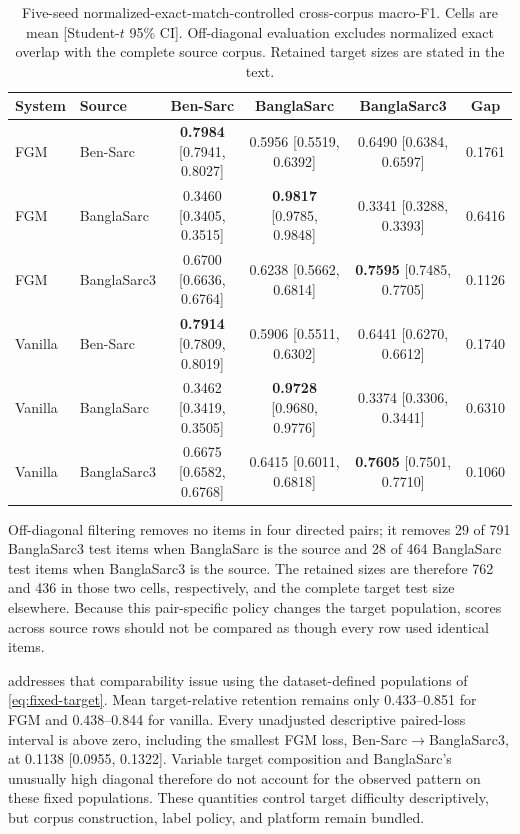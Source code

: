 \documentclass{ieeeaccess}
\begin{document}
\begin{table}[!t]
\centering
\caption{Five-seed normalized-exact-match-controlled cross-corpus macro-F1. Cells are mean [Student-$t$ 95\% CI]. Off-diagonal evaluation excludes normalized exact overlap with the complete source corpus. Retained target sizes are stated in the text.}
\label{tab:transfer}
\scriptsize
\setlength{\tabcolsep}{2.5pt}
\begin{tabular}{@{}llcccc@{}}
\toprule
\textbf{System} & \textbf{Source} & \textbf{Ben-Sarc} & \textbf{BanglaSarc} & \textbf{BanglaSarc3} & \textbf{Gap} \\
\midrule
FGM & Ben-Sarc & \textbf{0.7984} [0.7941, 0.8027] & 0.5956 [0.5519, 0.6392] & 0.6490 [0.6384, 0.6597] & 0.1761 \\
FGM & BanglaSarc & 0.3460 [0.3405, 0.3515] & \textbf{0.9817} [0.9785, 0.9848] & 0.3341 [0.3288, 0.3393] & 0.6416 \\
FGM & BanglaSarc3 & 0.6700 [0.6636, 0.6764] & 0.6238 [0.5662, 0.6814] & \textbf{0.7595} [0.7485, 0.7705] & 0.1126 \\
\midrule
Vanilla & Ben-Sarc & \textbf{0.7914} [0.7809, 0.8019] & 0.5906 [0.5511, 0.6302] & 0.6441 [0.6270, 0.6612] & 0.1740 \\
Vanilla & BanglaSarc & 0.3462 [0.3419, 0.3505] & \textbf{0.9728} [0.9680, 0.9776] & 0.3374 [0.3306, 0.3441] & 0.6310 \\
Vanilla & BanglaSarc3 & 0.6675 [0.6582, 0.6768] & 0.6415 [0.6011, 0.6818] & \textbf{0.7605} [0.7501, 0.7710] & 0.1060 \\
\bottomrule
\end{tabular}
\end{table}

Off-diagonal filtering removes no items in four directed pairs; it removes 29 of 791 BanglaSarc3 test items when BanglaSarc is the source and 28 of 464 BanglaSarc test items when BanglaSarc3 is the source. The retained sizes are therefore 762 and 436 in those two cells, respectively, and the complete target test size elsewhere. Because this pair-specific policy changes the target population, scores across source rows should not be compared as though every row used identical items.

 addresses that comparability issue using the
dataset-defined populations of \cref{eq:fixed-target}. Mean target-relative
retention remains only 0.433--0.851 for FGM and 0.438--0.844 for vanilla. Every
unadjusted descriptive paired-loss interval is above zero, including the
smallest FGM loss, Ben-Sarc$\rightarrow$BanglaSarc3, at 0.1138
[0.0955, 0.1322]. Variable target composition and BanglaSarc's unusually high
diagonal therefore do not account for the observed pattern on these fixed
populations. These quantities control target difficulty descriptively, but
corpus construction, label policy, and platform remain bundled.
\end{document}
